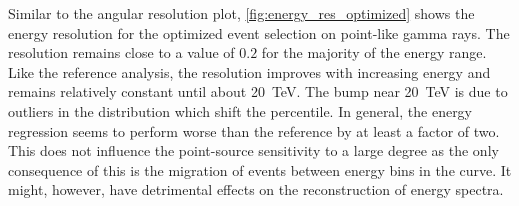 Similar to the angular resolution plot, \cref{fig:energy_res_optimized} shows the energy resolution for the optimized event selection
on point-like gamma rays.
The resolution remains close to a value of $0.2$ for the majority of the energy range. Like the reference analysis, the resolution 
improves with increasing energy and remains relatively constant until about \SI{20}{\TeV}.
The bump near \SI{20}{\TeV} is due to outliers in the distribution which shift the percentile.
In general, the energy regression seems to perform worse than the reference by at least a factor of two.
This does not influence the point-source sensitivity 
to a large degree as the only consequence of this is the migration of events between energy bins in the curve. 
It might, however, have detrimental effects on the reconstruction of energy spectra. 


